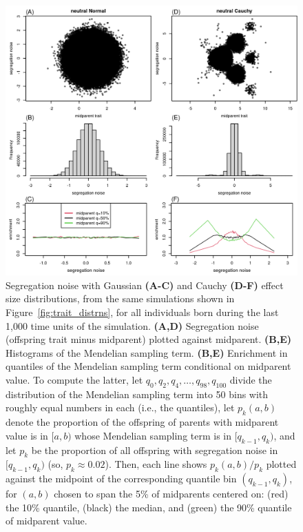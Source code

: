 \documentclass{article}
\newcommand{\1}{\mathbbm{1}}
\theoremstyle{remark}
\theoremstyle{definition}
\begin{document}
\begin{figure}
    \begin{center}
        \includegraphics{sims/neutral_seg_noise}
    \end{center}
    \caption{
        Segregation noise with Gaussian \textbf{(A-C)} and Cauchy \textbf{(D-F)} effect size distributions,
        from the same simulations shown in Figure~\ref{fig:trait_distrns},
        for all individuals born during the last 1,000 time units of the simulation.
        \textbf{(A,D)} Segregation noise (offspring trait minus midparent) plotted against midparent.
        \textbf{(B,E)} Histograms of the Mendelian sampling term.
        \textbf{(B,E)} Enrichment in quantiles of the Mendelian sampling term conditional on midparent value.
        To compute the latter,
        let $q_0, q_2, q_4, \ldots, q_{98}, q_{100}$ divide the distribution of the Mendelian sampling term
        into 50 bins with roughly equal numbers in each (i.e., the quantiles),
        let $p_k(a,b)$ denote the proportion of the offspring of parents with midparent value
        is in $[a, b)$ whose Mendelian sampling term is in $[q_{k-1}, q_k)$,
        and let $p_k$ be the proportion of all offspring with segregation noise in $[q_{k-1}, q_k)$
        (so, $p_k \approx 0.02$).
        Then, each line shows $p_k(a,b)/p_k$
        plotted against the midpoint of the corresponding quantile bin $(q_{k-1},q_k)$,
        for $(a,b)$ chosen to span the 5\% of midparents centered on:
        (red) the 10\% quantile,
        (black) the median, and
        (green) the 90\% quantile of midparent value.
        \label{fig:seg_noise}
    }
\end{figure}
\end{document}

